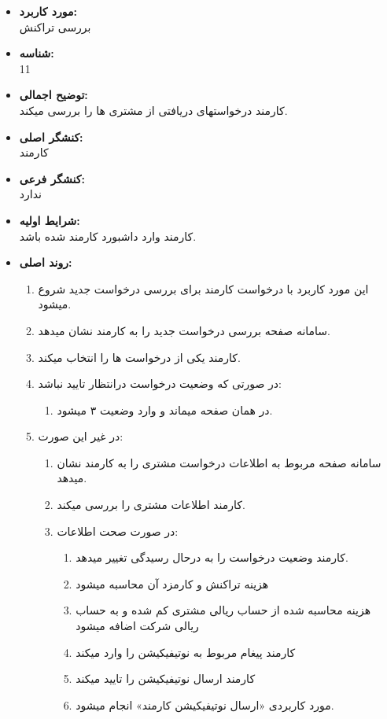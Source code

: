 \documentclass{article}
\begin{document}
\begin{itemize}
\item \textbf{مورد کاربرد:}\\
بررسی تراکنش
\item \textbf{شناسه:}\\
11
\item \textbf{توضیح اجمالی:}\\
کارمند درخواستهای دریافتی از مشتری ها را بررسی میکند.
\item \textbf{کنشگر اصلی:}\\
کارمند
\item \textbf{کنشگر فرعی:}\\
ندارد
\item \textbf{شرایط اولیه:}\\
کارمند وارد داشبورد کارمند شده باشد.
\item \textbf{روند اصلی:}\\
\begin{enumerate}
\item  این مورد کاربرد با درخواست کارمند برای بررسی درخواست جدید شروع میشود.
\item سامانه صفحه بررسی درخواست جدید را به کارمند نشان میدهد.
\item کارمند یکی از درخواست ها را انتخاب میکند.
\item در صورتی که وضعیت درخواست درانتظار تایید نباشد:
\begin{enumerate}
\item در همان صفحه میماند و وارد وضعیت ۳ میشود.
\end{enumerate}
\item در غیر این صورت:
\begin{enumerate}
\item سامانه صفحه مربوط به اطلاعات درخواست مشتری را به کارمند نشان میدهد.
\item کارمند اطلاعات مشتری را بررسی میکند.
\item در صورت صحت اطلاعات:
\begin{enumerate}
\item کارمند وضعیت درخواست را به درحال رسیدگی تغییر میدهد.
\item هزینه تراکنش و کارمزد آن محاسبه میشود
\item هزینه محاسبه شده از حساب ریالی مشتری کم شده و به حساب ریالی شرکت اضافه میشود
\item کارمند پیغام مربوط به نوتیفیکیشن را وارد میکند
\item کارمند ارسال نوتیفیکیشن را تایید میکند
\item مورد کاربردی  «ارسال نوتیفیکیشن کارمند» انجام میشود.

\end{enumerate}
\end{enumerate}
\end{enumerate}
\end{itemize}
\end{document}
